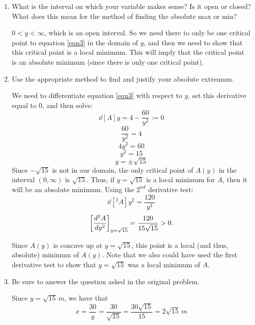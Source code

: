 \documentclass[nooutcomes]{ximera}
\begin{document}
\begin{problem}
\begin{enumerate}
    \item  What is the interval on which your variable makes sense?
      Is it open or closed?
      What does this mean for the method of finding the absolute max or min?
      \begin{freeResponse}
        $0 < y < \infty$, which is an open interval.
        So we need there to only be one critical point to equation \eqref{eqn3} in the domain of $y$, and then we need to show that this critical point is a local minimum.
        This will imply that the critical point is an absolute minimum (since there is only one critical point).  
      \end{freeResponse}
		
    \item  Use the appropriate method to find and justify your absolute extremum.
      \begin{freeResponse}
        We need to differentiate equation \eqref{eqn3} with respect to $y$, set this derivative equal to $0$, and then solve:
        $$ \dd[A]{y} = 4 - \frac{60}{y^2} :=0 $$
        $$ \frac{60}{y^2} = 4 $$
        $$ 4y^2 = 60 $$
        $$ y^2 = 15 $$
        $$ y = \pm \sqrt{15} $$
        Since $-\sqrt{15}$ is not in our domain, the only critical point of $A(y)$ in the interval $(0,\infty)$ is $\sqrt{15}$.  
        Thus, if $y=\sqrt{15}$ is a local minimum for $A$, then it will be an absolute minimum.  
        Using the $2^{nd}$ derivative test:
        $$ \dd[^2A]{y^2} = \frac{120}{y^3} $$
        $$ \eval{\dd[^2A]{y^2}}_{y=\sqrt{15}} = \frac{120}{15 \sqrt{15}} > 0. $$
        
        Since $A(y)$ is concave up at $y=\sqrt{15}$, this point is a local (and thus, absolute) minimum of $A(y)$.  
        Note that we also could have used the first derivative test to show that $y=\sqrt{15}$ was a local minimum of $A$.
      \end{freeResponse}
      
    \item  Be sure to answer the question asked in the original problem.
      \begin{freeResponse}
        Since $y=\sqrt{15} \, m$, we have that
        $$ x = \frac{30}{y} = \frac{30}{\sqrt{15}} = \frac{30 \sqrt{15}}{15} = 2 \sqrt{15} \, m $$
      \end{freeResponse}
    \end{enumerate}
\end{problem}
\end{document}
